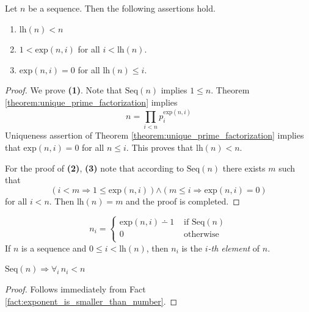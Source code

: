 \documentclass[10pt]{amsart}
\newcommand{\mforall}{\boldsymbol{\forall}}
\newcommand{\mra}{\boldsymbol{\Rightarrow}}
\newcommand{\mand}{\boldsymbol{\wedge}}
\newcommand{\mle}{\boldsymbol{<}}
\newcommand{\mleq}{\boldsymbol{\leq}}
\newcommand{\meq}{\boldsymbol{=}}
\begin{document}
\begin{fact}\label{fact:properties_of_sequence_length}
	Let $n$ be a sequence. Then the following assertions hold.
	\begin{enumerate}[label=\emph{\textbf{(\arabic*)}}, leftmargin=3.0em]
		\item $\mathrm{lh}(n) \mle n$
		\item $1 \mle \mathrm{exp}(n,i)$ for all $i \mle \mathrm{lh}(n)$.
		\item $\mathrm{exp}(n,i) \meq 0$ for all $\mathrm{lh}(n) \mleq i$.
	\end{enumerate}
\end{fact}
\begin{proof}
	We prove \textbf{(1)}. Note that $\mathrm{Seq}(n)$ implies $1 \mleq n$. Theorem \ref{theorem:unique_prime_factorization} implies
	$$n \meq \prod_{i \mle n}p_i^{\mathrm{exp}(n,i)}$$
	Uniqueness assertion of Theorem \ref{theorem:unique_prime_factorization} implies that $\mathrm{exp}(n,i) \meq 0$ for all $n \mleq i$. This proves that $\mathrm{lh}(n) \mle n$.

	For the proof of \textbf{(2)}, \textbf{(3)} note that according to $\mathrm{Seq}(n)$ there exists $m$ such that
	$$\left(i \mle m \mra 1 \mleq \mathrm{exp}(n,i)\right) \mand \left(m \mleq i \mra \mathrm{exp}(n,i) \meq 0\right)$$
	for all $i \mle n$. Then $\mathrm{lh}(n) \meq m$ and the proof is completed.
\end{proof}

\begin{definition}
	$$n_i \meq \begin{cases}
			\mathrm{exp}(n,i) \dotminus 1 & \mbox{ if }\mathrm{Seq}(n) \\
			0                             & \mbox{ otherwise }         \\
		\end{cases}
	$$
	If $n$ is a sequence and $0 \mleq i \mle \mathrm{lh}(n)$, then $n_i$ is the \textit{$i$-th element} of $n$.
\end{definition}

\begin{corollary}\label{corollary:sequence_element_is_smaller_than_sequence_itself}
  $\mathrm{Seq}(n) \mra \mforall_i\,n_i \mle n$
\end{corollary}
\begin{proof}
  Follows immediately from Fact \ref{fact:exponent_is_smaller_than_number}.
\end{proof}
\end{document}
